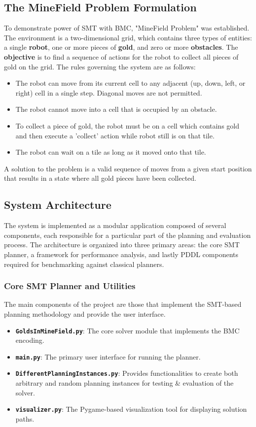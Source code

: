 \documentclass[12pt, a4paper, oneside]{report} %
\begin{document}
\subsection{The MineField Problem Formulation}
To demonstrate power of SMT with BMC, "MineField Problem" was established. The environment is a two-dimensional grid, which contains three types of entities: a single \textbf{robot}, one or more pieces of \textbf{gold}, and zero or more \textbf{obstacles}. The \textbf{objective} is to find a sequence of actions for the robot to collect all pieces of gold on the grid.
The rules governing the system are as follows:
\begin{itemize}
    \item The robot can move from its current cell to any adjacent (up, down, left, or right) cell in a single step. Diagonal moves are not permitted.
    \item The robot cannot move into a cell that is occupied by an obstacle.
    \item To collect a piece of gold, the robot must be on a cell which contains gold and then execute a 'collect' action while robot still is on that tile.
    \item The robot can wait on a tile as long as it moved onto that tile.
\end{itemize}
A solution to the problem is a valid sequence of moves from a given start position that results in a state where all gold pieces have been collected.
\subsection{System Architecture}
The system is implemented as a modular application composed of several components, each responsible for a particular part of the planning and evaluation process. The architecture is organized into three primary areas: the core SMT planner, a framework for performance analysis, and lastly PDDL components required for benchmarking against classical planners.
\subsubsection{Core SMT Planner and Utilities}
The main components of the project are those that implement the SMT-based planning methodology and provide the user interface.
\begin{itemize}
    \item \textbf{\texttt{GoldsInMineField.py}}: The core solver module that implements the BMC encoding.
    \item \textbf{\texttt{main.py}}: The primary user interface for running the planner.
    \item \textbf{\texttt{DifferentPlanningInstances.py}}: Provides functionalities to create both arbitrary and random planning instances for testing \& evaluation of the solver.
    \item \textbf{\texttt{visualizer.py}}: The Pygame-based visualization tool for displaying solution paths.
\end{itemize}
\end{document}
